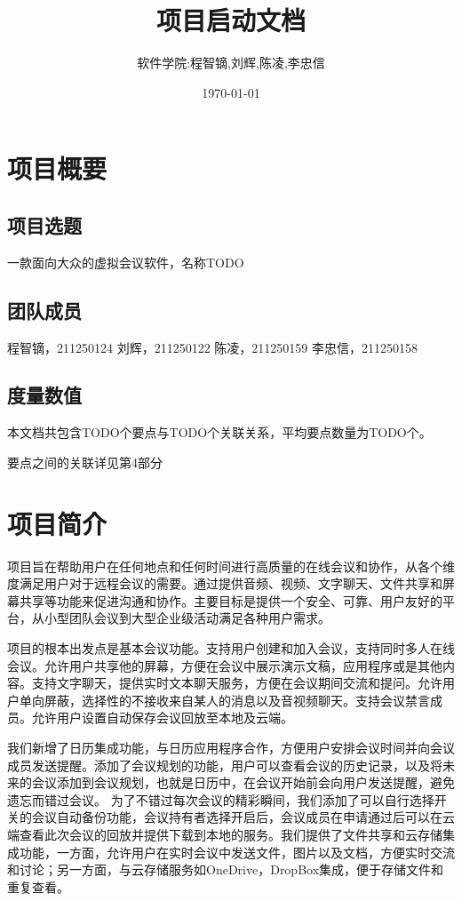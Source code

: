 \documentclass[a4paper,12pt]{article}
\title{项目启动文档}
\author{软件学院:程智镝,刘辉,陈凌,李忠信}
\date{\today}
\begin{document}
\maketitle

\tableofcontents

\section{项目概要}

\subsection{项目选题}
一款面向大众的虚拟会议软件，名称TODO
\subsection{团队成员}
程智镝，211250124
刘辉，211250122
陈凌，211250159
李忠信，211250158
\subsection{度量数值}
本文档共包含TODO个要点与TODO个关联关系，平均要点数量为TODO个。

要点之间的关联详见第4部分

\section{项目简介}
项目旨在帮助用户在任何地点和任何时间进行高质量的在线会议和协作，从各个维度满足用户对于远程会议的需要。通过提供音频、视频、文字聊天、文件共享和屏幕共享等功能来促进沟通和协作。主要目标是提供一个安全、可靠、用户友好的平台，从小型团队会议到大型企业级活动满足各种用户需求。

项目的根本出发点是基本会议功能。支持用户创建和加入会议，支持同时多人在线会议。允许用户共享他的屏幕，方便在会议中展示演示文稿，应用程序或是其他内容。支持文字聊天，提供实时文本聊天服务，方便在会议期间交流和提问。允许用户单向屏蔽，选择性的不接收来自某人的消息以及音视频聊天。支持会议禁言成员。允许用户设置自动保存会议回放至本地及云端。

我们新增了日历集成功能，与日历应用程序合作，方便用户安排会议时间并向会议成员发送提醒。添加了会议规划的功能，用户可以查看会议的历史记录，以及将未来的会议添加到会议规划，也就是日历中，在会议开始前会向用户发送提醒，避免遗忘而错过会议。
为了不错过每次会议的精彩瞬间，我们添加了可以自行选择开关的会议自动备份功能，会议持有者选择开启后，会议成员在申请通过后可以在云端查看此次会议的回放并提供下载到本地的服务。我们提供了文件共享和云存储集成功能，一方面，允许用户在实时会议中发送文件，图片以及文档，方便实时交流和讨论；另一方面，与云存储服务如OneDrive，DropBox集成，便于存储文件和重复查看。
\end{document}

